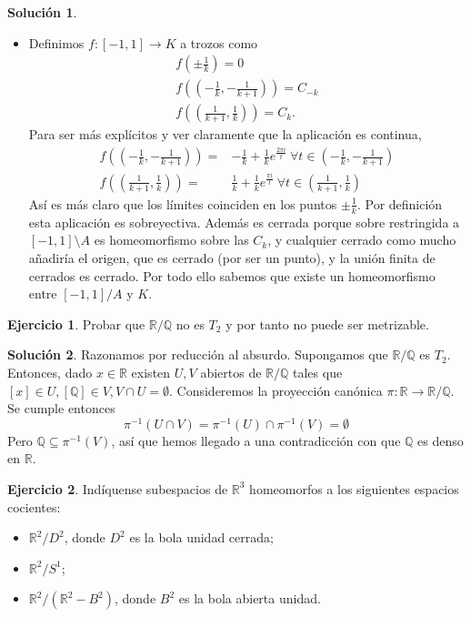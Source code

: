 \documentclass{article}
\theoremstyle{plain}
\theoremstyle{definition}
\newtheorem{exercise}{Ejercicio}
\newtheorem*{sol*}{Solución}
\newcommand{\R}{\mathbb{R}}
\newcommand{\Q}{\mathbb{Q}}
\begin{document}
\begin{sol*}
\begin{itemize}
\item Definimos $f:[-1,1]\rightarrow K$ a trozos como 
\begin{gather*}
f\left(\pm\frac{1}{k}\right)=0\\
f\left(\left(-\frac{1}{k},-\frac{1}{k+1}\right)\right)=C_{-k}\\
f\left(\left(\frac{1}{k+1},\frac{1}{k}\right)\right)=C_k.
\end{gather*}
Para ser más explícitos y ver claramente que la aplicación es continua, 
\begin{align*}
f\left(\left(-\frac{1}{k},-\frac{1}{k+1}\right)\right)=&-\frac{1}{k}+\frac{1}{k}e^{\frac{2\pi i}{t}}\ \forall t\in\left(-\frac{1}{k},-\frac{1}{k+1}\right)\\
f\left(\left(\frac{1}{k+1},\frac{1}{k}\right)\right)=&\frac{1}{k}+\frac{1}{k}e^{\frac{\pi i}{t}}\ \forall t\in\left(\frac{1}{k+1},\frac{1}{k}\right)
\end{align*}
Así es más claro que los límites coinciden en los puntos $\pm\frac{1}{k}$. Por definición esta aplicación es sobreyectiva. Además es cerrada porque sobre restringida a $[-1,1]\setminus A$ es homeomorfismo sobre las $C_k$, y cualquier cerrado como mucho añadiría el origen, que es cerrado (por ser un punto), y la unión finita de cerrados es cerrado.
Por todo ello sabemos que existe un homeomorfismo entre $[-1,1]/A$ y $K$. 
\end{itemize} 

\end{sol*}

\newpage
\begin{exercise}
Probar que $\mathbb{R}/\mathbb{Q}$ no es $T_2$ y por tanto no puede ser metrizable.
\end{exercise}
\begin{sol*}
Razonamos por reducción al absurdo. Supongamos que $\mathbb{R}/\mathbb{Q}$ es $T_2$. Entonces, dado $x\in\R$ existen $U,V$ abiertos de $\mathbb{R}/\mathbb{Q}$ tales que $[x]\in U, [\Q]\in V, V\cap U=\emptyset$. Consideremos la proyección canónica $\pi:\R\rightarrow\mathbb{R}/\mathbb{Q}$. Se cumple entonces
\[\pi^{-1}(U\cap V)=\pi^{-1}(U)\cap\pi^{-1}(V)=\emptyset\]
Pero $\Q\subseteq \pi^{-1}(V)$, así que hemos llegado a una contradicción con que $\Q$ es denso en $\R$. 
\end{sol*}


\newpage
\begin{exercise}
Indíquense subespacios de $\mathbb{R}^3$ homeomorfos a los siguientes espacios cocientes:
\begin{itemize}
	\item $\mathbb{R}^2/D^2$, donde $D^2$ es la bola unidad cerrada;
	\item $\mathbb{R}^2/S^1$;
	\item $\mathbb{R}^2/(\mathbb{R}^2-B^2)$, donde $B^2$ es la bola abierta unidad.
\end{itemize}
\end{exercise}
\end{document}
